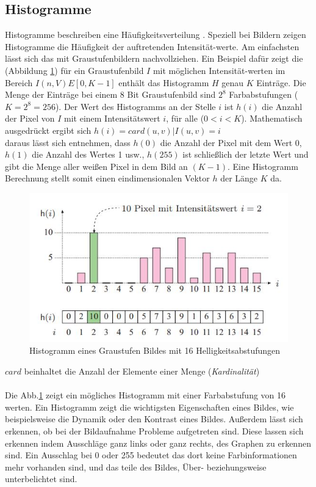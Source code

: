 \documentclass[a4paper,12pt,oneside]{article}
\begin{document}
\subsection{Histogramme}\label{s.histogramme}
Histogramme beschreiben eine Häufigkeitsverteilung \cite[42ff.]{burger2009digitale}. Speziell bei Bildern zeigen Histogramme die Häufigkeit der auftretenden Intensität-werte. Am einfachsten lässt sich das mit Graustufenbildern nachvollziehen. Ein Beispiel dafür zeigt die (Abbildung \ref{img:histogramm}) für ein Graustufenbild $I$ mit möglichen Intensität-werten im Bereich $I(n,V)E[0,K-1]$ enthält das Histogramm $H$ genau $K$ Einträge. Die Menge der Einträge bei einem 8 Bit Graustufenbild sind $2^8$ Farbabstufungen ($K=2^8=256$). Der Wert des Histogramms an der Stelle $i$ ist $h(i)$ die Anzahl der Pixel von $I$ mit einem Intensitätswert $i$, für alle ($0<i<K$). Mathematisch ausgedrückt ergibt sich $h(i)=card{(u,v) | I(u,v)=i}$\\
  daraus lässt sich entnehmen, dass $h(0)$ die Anzahl der Pixel mit dem Wert 0, $h(1)$ die Anzahl des Wertes 1 usw., $h(255)$ ist schließlich der letzte Wert und gibt die Menge aller weißen Pixel in dem Bild an $(K-1)$. Eine Histogramm Berechnung stellt somit einen eindimensionalen Vektor $h$ der Länge $K$ da.\\
  \begin{figure}
    [h]
    \centering
    \includegraphics[scale=1.0]{Sources/histogramm.jpg}
    \caption{Histogramm eines Graustufen Bildes mit 16 Helligkeitsabstufungen \cite[42]{burger2009digitale}}
    \label{img:histogramm}
  \end{figure}
$card$ beinhaltet die Anzahl der Elemente einer Menge (\textit{Kardinalität})\\\\
Die Abb.\ref{img:histogramm} zeigt ein mögliches Histogramm mit einer Farbabstufung von 16 werten. Ein Histogramm zeigt die wichtigsten Eigenschaften eines Bildes, wie beispielsweise die Dynamik oder den Kontrast eines Bildes. Außerdem lässt sich erkennen, ob bei der Bildaufnahme Probleme aufgetreten sind. Diese lassen sich erkennen indem Ausschläge ganz links oder ganz rechts, des Graphen zu erkennen sind. Ein Ausschlag bei 0 oder 255 bedeutet das dort keine Farbinformationen mehr vorhanden sind, und das teile des Bildes, Über- beziehungsweise unterbelichtet sind.\\\\
\end{document}
